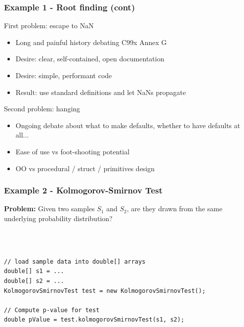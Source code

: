 \documentclass[14pt,mathserif]{beamer}
\begin{document}
\begin{frame}[fragile]
  \frametitle{Example 1 - Root finding (cont)}

\begin{small}  
 First problem:  escape to NaN
\begin{itemize}
  \item Long and painful history debating C99x Annex G
  \item Desire: clear, self-contained, open documentation
  \item Desire: simple, performant code
  \item Result: use standard definitions and let NaNs propagate
\end{itemize}
Second problem: hanging
\begin{itemize}
  \item Ongoing debate about what to make defaults, whether to have defaults at all...
  \item Ease of use vs foot-shooting potential
  \item OO vs procedural / struct / primitives design
\end{itemize}
\end{small}
\end{frame} 
\begin{frame}[fragile]
  \frametitle{Example 2 - Kolmogorov-Smirnov Test}

\begin{small}
\textbf{Problem:}  Given two samples \(S_1\) and \(S_2\), are they drawn from the
same underlying probability distribution?
\end{small}
\\
\begin{verbatim}

// load sample data into double[] arrays
double[] s1 = ... 
double[] s2 = ...
KolmogorovSmirnovTest test = new KolmogorovSmirnovTest();

// Compute p-value for test
double pValue = test.kolmogorovSmirnovTest(s1, s2);

\end{verbatim}
\end{frame}
\end{document}
